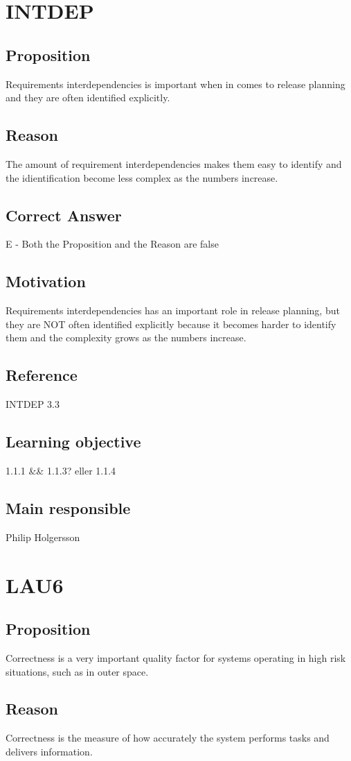 \documentclass[a4paper]{article}
\begin{document}
\section{INTDEP}
\subsection*{Proposition}
Requirements interdependencies is important when in comes to release planning and they are often identified explicitly.
\subsection*{Reason}
The amount of requirement interdependencies makes them easy to identify and the idientification become less complex as the numbers increase.
\subsection*{Correct Answer}
E - Both the Proposition and the Reason are false
\subsection*{Motivation}
Requirements interdependencies has an important role in release planning, but they are NOT often identified explicitly because it becomes harder to identify them and the complexity grows as the numbers increase.
\subsection*{Reference}
INTDEP 3.3
\subsection*{Learning objective}
1.1.1 \&\& 1.1.3? eller 1.1.4
\subsection*{Main responsible}
Philip Holgersson


\section{LAU6}
\subsection*{Proposition}
Correctness is a very important quality factor for systems operating in high risk situations, such as in outer space.
\subsection*{Reason}
Correctness is the measure of how accurately the system performs tasks and delivers information.
\end{document}
